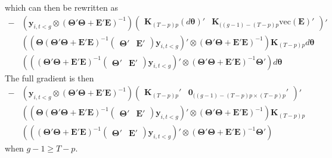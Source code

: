 \documentclass[12pt]{article}
\begin{document}
which can then be rewritten as 
\begin{align}
    -&
    \left( \bm y_{i,t < g} \otimes \left( \bm \Theta' \bm \Theta + \bm E' \bm E \right)^{-1} \right)     \begin{pmatrix}
        \bm K_{(T-p)p} (d \bm \theta)' & \bm K_{((g-1) - (T-p)p} \text{vec}(\bm E)'
    \end{pmatrix}'\\
    &
    \left( \left( \bm \Theta \left( \bm \Theta' \bm \Theta + \bm E' \bm E \right)^{-1}
    \begin{pmatrix}
        \bm \Theta' & \bm E'
    \end{pmatrix}
    \bm y_{i,t < g} \right)' \otimes \left( \bm \Theta' \bm \Theta + \bm E' \bm E \right)^{-1} \right) \bm K_{(T-p)p} d \bm \theta\\
    &
    \left( \left( \left( \bm \Theta' \bm \Theta + \bm E' \bm E \right)^{-1}
    \begin{pmatrix}
        \bm \Theta' & \bm E'
    \end{pmatrix}
    \bm y_{i,t < g} \right)' \otimes \left( \bm \Theta' \bm \Theta + \bm E' \bm E \right)^{-1} \bm \Theta' \right) d \bm \theta
\end{align}
The full gradient is then 
\begin{align}
    -&
    \left( \bm y_{i,t < g} \otimes \left( \bm \Theta' \bm \Theta + \bm E' \bm E \right)^{-1} \right)     \begin{pmatrix}
        \bm K_{(T-p)p}' & \bm 0_{((g-1) - (T-p)p \times (T-p)p} '
    \end{pmatrix}'\\
    &
    \left( \left( \bm \Theta \left( \bm \Theta' \bm \Theta + \bm E' \bm E \right)^{-1}
    \begin{pmatrix}
        \bm \Theta' & \bm E'
    \end{pmatrix}
    \bm y_{i,t < g} \right)' \otimes \left( \bm \Theta' \bm \Theta + \bm E' \bm E \right)^{-1} \right) \bm K_{(T-p)p}\\
    &
    \left( \left( \left( \bm \Theta' \bm \Theta + \bm E' \bm E \right)^{-1}
    \begin{pmatrix}
        \bm \Theta' & \bm E'
    \end{pmatrix}
    \bm y_{i,t < g} \right)' \otimes \left( \bm \Theta' \bm \Theta + \bm E' \bm E \right)^{-1} \bm \Theta' \right)
\end{align}
when $g - 1 \geq T-p$. 
\end{document}
